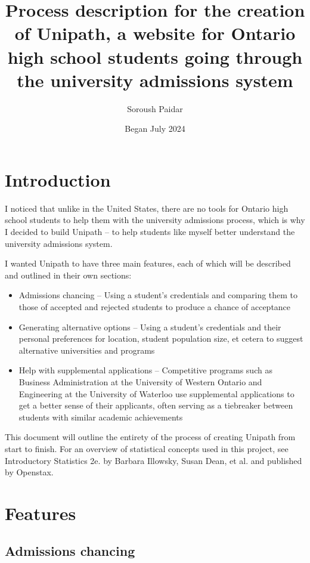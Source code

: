 \documentclass{article}
\title{Process description for the creation of Unipath, a website for Ontario high school students going through the university admissions system}
\author{Soroush Paidar}
\date{Began July 2024}
\begin{document}
    \maketitle

    \section{Introduction}
    I noticed that unlike in the United States, there are no tools for Ontario high school students to help them with the university admissions process, which is why I decided to build Unipath -- to help students like myself better understand the university admissions system.

    I wanted Unipath to have three main features, each of which will be described and outlined in their own sections:
    \begin{itemize}

        \item {Admissions chancing -- Using a student's credentials and comparing them to those of accepted and rejected students to produce a chance of acceptance}
        \item {Generating alternative options -- Using a student's credentials and their personal preferences for location, student population size, et cetera to suggest alternative universities and programs}
        \item {Help with supplemental applications -- Competitive programs such as Business Administration at the University of Western Ontario and Engineering at the University of Waterloo use supplemental applications to get a better sense of their applicants, often serving as a tiebreaker between students with similar academic achievements}

    \end{itemize}

    This document will outline the entirety of the process of creating Unipath from start to finish. For an overview of statistical concepts used in this project, see Introductory Statistics 2e. by Barbara Illowsky, Susan Dean, et al. and published by Openstax.

    \section{Features}
    \subsection{Admissions chancing}
\end{document}
